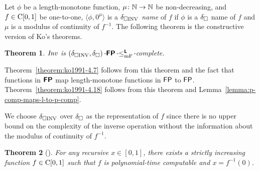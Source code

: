 \documentclass{article}
\newtheorem{theorem}{Theorem}[section]
\theoremstyle{definition}
\theoremstyle{remark}
\begin{document}
Let $\phi$ be a length-monotone function, $\mu \colon \mathbb N \to \mathbb N$ be non-decreasing, and $f \in \mathrm C[0,1]$ be one-to-one,
$\langle \phi, 0^\mu \rangle$ is a \emph{$\delta _{\square \mathrm{INV}}$ name} of $f$
if $\phi$ is a $\delta _\square$ name of $f$ and $\mu$ is a modulus of continuity of $f^{-1}$.
The following theorem is the constructive version of Ko's theorems.

\begin{theorem}
 \label{theorem:INV-is-P-complete}
 $\mathit{Inv}$ is $(\delta _{\square \mathrm{INV}}, \delta _\square)$-$\text{\bfseries \sffamily \upshape FP}$-$\leq _{\mathrm{mF}} ^{\text{\bfseries \sffamily \upshape L}}$-complete.
\end{theorem}


Theorem~\ref{theorem:ko1991-4.7} follows from this theorem and the fact that
functions in $\text{\bfseries \sffamily \upshape FP}$ map length-monotone functions in $\mathsf{FP}$ to $\mathsf{FP}$.
Theorem~\ref{theorem:ko1991-4.18} follows from this theorem and Lemma~\ref{lemma:p-comp-maps-l-to-p-comp}.


We choose $\delta _{\square \mathrm{INV}}$  over $\delta _\square$ as the representation of $f$
since there is no upper bound on the complexity of the inverse operation 
without the information about the modulus of continuity of $f^{-1}$.

\begin{theorem}[{\cite[Theorem 4.4]{ko1991complexity}}]
For any recursive $x \in [0, 1]$, 
there exists a strictly increasing function $f \in \mathrm C[0, 1]$ 
such that $f$ is polynomial-time computable and $x = f^{-1}(0)$.
\end{theorem}
\end{document}
